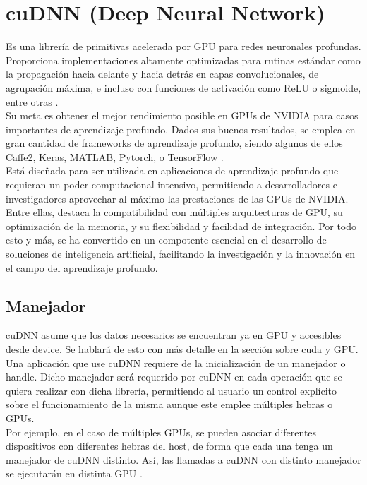 \section{cuDNN (Deep Neural Network)}

Es una librería de primitivas acelerada por GPU para redes neuronales profundas. Proporciona implementaciones altamente optimizadas para rutinas estándar como la propagación hacia delante y hacia detrás en capas convolucionales, de agrupación máxima, e incluso con funciones de activación como ReLU o sigmoide, entre otras \cite{cuDNN}. \\
Su meta es obtener el mejor rendimiento posible en GPUs de NVIDIA para casos importantes de aprendizaje profundo. Dados sus buenos resultados, se emplea en gran cantidad de frameworks de aprendizaje profundo, siendo algunos de ellos Caffe2, Keras, MATLAB, Pytorch, o TensorFlow \cite{cuDNN_librerias}. \\
Está diseñada para ser utilizada en aplicaciones de aprendizaje profundo que requieran un poder computacional intensivo, permitiendo a desarrolladores e investigadores aprovechar al máximo las prestaciones de las GPUs de NVIDIA. Entre ellas, destaca la compatibilidad con múltiples arquitecturas de  GPU, su optimización de la memoria, y su flexibilidad y facilidad de integración. Por todo esto y más, se ha convertido en un compotente esencial en el desarrollo de soluciones de inteligencia artificial, facilitando la investigación y la innovación en el campo del aprendizaje profundo.


\subsection{Manejador}

cuDNN asume que los datos necesarios se encuentran ya en GPU y accesibles desde device. Se hablará de esto con más detalle en la sección sobre cuda y GPU. \\
Una aplicación que use cuDNN requiere de la inicialización de un manejador o handle. Dicho manejador será requerido por cuDNN en cada operación que se quiera realizar con dicha librería, permitiendo al usuario un control explícito sobre el funcionamiento de la misma aunque este emplee múltiples hebras o GPUs. \\
Por ejemplo, en el caso de múltiples GPUs, se pueden asociar diferentes dispositivos con diferentes hebras del host, de forma que cada una tenga un manejador de cuDNN distinto. Así, las llamadas a cuDNN con distinto manejador se ejecutarán en distinta GPU \cite{cuDNN_core_concepts}.

